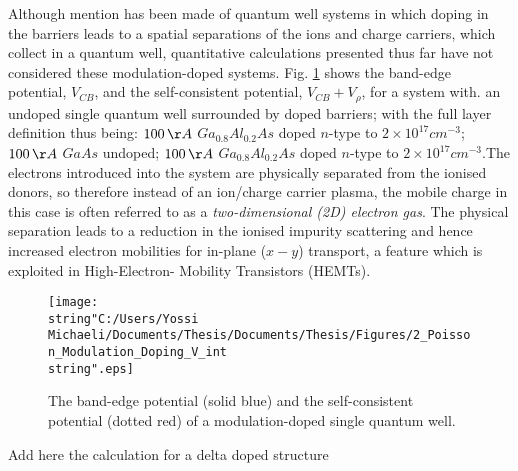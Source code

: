 Although mention has been made of quantum well systems in which doping
in the barriers leads to a spatial separations of the ions and charge
carriers, which collect in a quantum well, quantitative calculations
presented thus far have not considered these modulation-doped systems.
Fig. \ref{fig:Poisson_Modulation_Doped_V} shows the band-edge potential,
$V_{CB}$, and the self-consistent potential, $V_{CB}+V_{\rho}$,
for a system with. an undoped single quantum well surrounded by doped
barriers; with the full layer definition thus being: $100\,\AA$ $Ga_{0.8}Al_{0.2}As$
doped $n$-type to $2\times10^{17}cm^{-3}$; $100\,\AA$ $GaAs$ undoped;
$100\,\AA$ $Ga_{0.8}Al_{0.2}As$ doped $n$-type to $2\times10^{17}cm^{-3}$.The
electrons introduced into the system are physically separated from
the ionised donors, so therefore instead of an ion/charge carrier
plasma, the mobile charge in this case is often referred to as a\emph{
two-dimensional (2D) electron gas}. The physical separation leads
to a reduction in the ionised impurity scattering and hence increased
electron mobilities for in-plane ($x-y$) transport, a feature which
is exploited in High-Electron- Mobility Transistors (HEMTs).%
\begin{figure}
\begin{centering}
\texttt{[image: \\string"C:/Users/Yossi Michaeli/Documents/Thesis/Documents/Thesis/Figures/2\_Poisson\_Modulation\_Doping\_V\_int\\string".eps]}
\par\end{centering}

\caption{\label{fig:Poisson_Modulation_Doped_V}The band-edge potential (solid
blue) and the self-consistent potential (dotted red) of a modulation-doped
single quantum well.}

\end{figure}


%
\begin{lyxgreyedout}
Add here the calculation for a delta doped structure
\end{lyxgreyedout}

